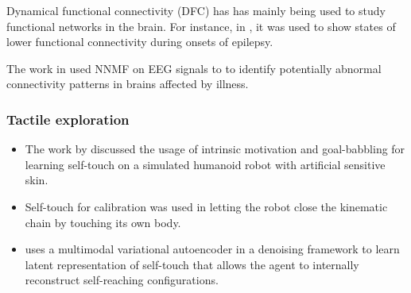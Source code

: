 Dynamical functional connectivity (DFC) has has mainly being used to study functional networks in the brain. For instance, in \cite{Christiaen2020Dynamicfunctionalconnectivity}, it was used to show states of lower functional connectivity during onsets of epilepsy.

The work in \cite{Zhou2020Earlychildhooddevelopmental} used NNMF on EEG signals to to identify potentially abnormal connectivity patterns in brains affected by illness.

\subsubsection{Tactile exploration}

\begin{itemize}
	\item The work by \cite{Gama2021Goaldirectedtactile} discussed the usage of intrinsic motivation and goal-babbling for learning self-touch on a simulated humanoid robot with artificial sensitive skin.
	\item Self-touch for calibration was used in \cite{Roncone2014Automatickinematicchain} letting the robot close the kinematic chain by touching its own body.
	\item \cite{Marcel2022Learningreachown} uses a multimodal variational autoencoder in a denoising framework to learn latent representation of self-touch that allows the agent to internally reconstruct self-reaching configurations. 
\end{itemize}


